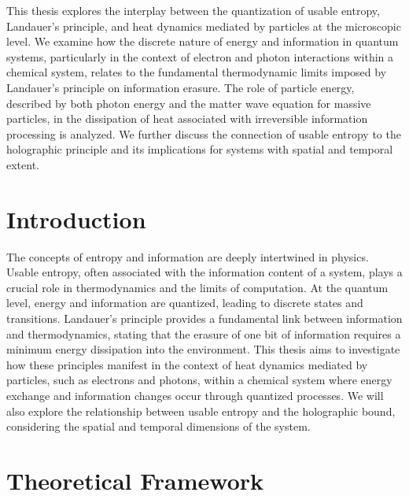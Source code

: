 
















	
	
		This thesis explores the interplay between the quantization of usable entropy, Landauer's principle, and heat dynamics mediated by particles at the microscopic level. We examine how the discrete nature of energy and information in quantum systems, particularly in the context of electron and photon interactions within a chemical system, relates to the fundamental thermodynamic limits imposed by Landauer's principle on information erasure. The role of particle energy, described by both photon energy and the matter wave equation for massive particles, in the dissipation of heat associated with irreversible information processing is analyzed. We further discuss the connection of usable entropy to the holographic principle and its implications for systems with spatial and temporal extent.

	
	\section{Introduction}
	The concepts of entropy and information are deeply intertwined in physics. Usable entropy, often associated with the information content of a system, plays a crucial role in thermodynamics and the limits of computation. At the quantum level, energy and information are quantized, leading to discrete states and transitions. Landauer's principle provides a fundamental link between information and thermodynamics, stating that the erasure of one bit of information requires a minimum energy dissipation into the environment. This thesis aims to investigate how these principles manifest in the context of heat dynamics mediated by particles, such as electrons and photons, within a chemical system where energy exchange and information changes occur through quantized processes. We will also explore the relationship between usable entropy and the holographic bound, considering the spatial and temporal dimensions of the system.
	
	\section{Theoretical Framework}
	
